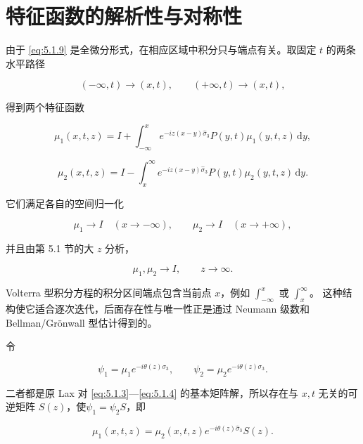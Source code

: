 \documentclass[
    lang=cn,
    scheme=chinese,
    mode=simple,
    device=normal,
    color=blue,
    math=cm,
    thmcnt=section,
    12pt
]{elegantbook}
\begin{document}
\section{特征函数的解析性与对称性}

由于 \eqref{eq:5.1.9} 是全微分形式，在相应区域中积分只与端点有关。取固定 $t$ 的两条水平路径

\[
    (-\infty,t)\to(x,t),
    \qquad
    (+\infty,t)\to(x,t),
\]

得到两个特征函数

\begin{equation}
    \mu_1(x,t,z)
    =
    I+
    \int_{-\infty}^{x}
    e^{-iz(x-y)\widehat{\sigma}_3}
    P(y,t)\mu_1(y,t,z)\,\mathrm dy,
    \tag{5.2.1}
    \label{eq:5.2.1}
\end{equation}

\begin{equation}
    \mu_2(x,t,z)
    =
    I-
    \int_x^{\infty}
    e^{-iz(x-y)\widehat{\sigma}_3}
    P(y,t)\mu_2(y,t,z)\,\mathrm dy.
    \tag{5.2.2}
    \label{eq:5.2.2}
\end{equation}

它们满足各自的空间归一化

\[
    \mu_1\to I\quad(x\to-\infty),
    \qquad
    \mu_2\to I\quad(x\to+\infty),
\]

并且由第 5.1 节的大 $z$ 分析，

\[
    \mu_1,\mu_2\to I,\qquad z\to\infty.
\]

\begin{callout}
    Volterra 型积分方程的积分区间端点包含当前点 $x$，例如 $\displaystyle\int_{-\infty}^x$ 或 $\displaystyle\int_x^\infty$。
    这种结构使它适合逐次迭代，后面存在性与唯一性正是通过 Neumann 级数和 Bellman/Grönwall 型估计得到的。
\end{callout}

令

\[
    \psi_1=\mu_1e^{-i\theta(z)\sigma_3},
    \qquad
    \psi_2=\mu_2e^{-i\theta(z)\sigma_3}.
\]

二者都是原 Lax 对 \eqref{eq:5.1.3}---\eqref{eq:5.1.4} 的基本矩阵解，所以存在与 $x,t$ 无关的可逆矩阵 $S(z)$，使$\psi_1=\psi_2S$，即

\begin{equation}
    \mu_1(x,t,z)
    =
    \mu_2(x,t,z)e^{-i\theta(z)\widehat{\sigma}_3}S(z).
    \tag{5.2.3}
    \label{eq:5.2.3}
\end{equation}
\end{document}

